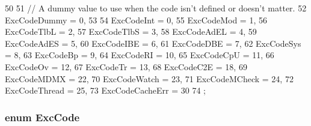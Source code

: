 \begin{DoxyCode}
50              {
51     // A dummy value to use when the code isn't defined or doesn't matter.
52     ExcCodeDummy = 0,
53 
54     ExcCodeInt = 0,
55     ExcCodeMod = 1,
56     ExcCodeTlbL = 2,
57     ExcCodeTlbS = 3,
58     ExcCodeAdEL = 4,
59     ExcCodeAdES = 5,
60     ExcCodeIBE = 6,
61     ExcCodeDBE = 7,
62     ExcCodeSys = 8,
63     ExcCodeBp = 9,
64     ExcCodeRI = 10,
65     ExcCodeCpU = 11,
66     ExcCodeOv = 12,
67     ExcCodeTr = 13,
68     ExcCodeC2E = 18,
69     ExcCodeMDMX = 22,
70     ExcCodeWatch = 23,
71     ExcCodeMCheck = 24,
72     ExcCodeThread = 25,
73     ExcCodeCacheErr = 30
74 };
\end{DoxyCode}
\hypertarget{namespaceMipsISA_abcc8a7c57cd8becefbfd621dbff5ffd4}{
\subsubsection[{ExcCode}]{\setlength{\rightskip}{0pt plus 5cm}enum {\bf ExcCode}}}
\label{namespaceMipsISA_abcc8a7c57cd8becefbfd621dbff5ffd4}
